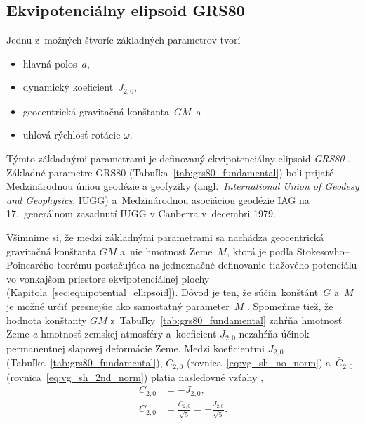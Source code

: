 \documentclass[a4paper,12pt]{book}
\begin{document}
\subsection{Ekvipotenciálny elipsoid GRS80}
\label{sec:grs80}

Jednu z~možných štvoríc základných parametrov tvorí
%
\begin{itemize}
\item hlavná polos~$a$,
%
\item dynamický koeficient~$J_{2,0}$,
%
\item geocentrická gravitačná konštanta~$GM$~a
%
\item uhlová rýchlosť rotácie $\omega$.
\end{itemize}
%
Týmto základnými parametrami je definovaný ekvipotenciálny elipsoid 
\emph{GRS80} \parencite[angl. \textit{Geodetic Reference 
System~1980};][]{GRS80}.  Základné parametre GRS80 
(Tabuľka~\ref{tab:grs80_fundamental}) boli prijaté Medzinárodnou úniou geodézie 
a geofyziky (angl.~\textit{International Union of Geodesy and Geophysics}, 
IUGG) a~Medzinárodnou asociáciou geodézie IAG na 17.~generálnom zasadnutí IUGG 
v Canberra v~decembri 1979.

Všimnime si, že medzi základnými parametrami sa nachádza geocentrická 
gravitačná konštanta $GM$ a~nie hmotnosť Zeme~$M$, ktorá je podľa 
Stokesovho--Poincarého teorému postačujúca na jednoznačné definovanie tiažového 
potenciálu vo vonkajšom priestore ekvipotenciálnej plochy 
(Kapitola~\ref{sec:equipotential_ellipsoid}).  Dôvod je ten, že 
súčin~konštánt~$G$ a~$M$ je možné určiť presnejšie ako samostatný parameter~$M$ 
\parencite[pozri napríklad][]{Pick2000}.  Spomeňme tiež, že hodnota konštanty 
$GM$ z~Tabuľky~\ref{tab:grs80_fundamental} zahŕňa hmotnosť Zeme \emph{a} 
hmotnosť zemskej atmosféry a~koeficient $J_{2,0}$ nezahŕňa účinok permanentnej 
slapovej deformácie Zeme.  Medzi koeficientmi $J_{2,0}$ 
(Tabuľka~\ref{tab:grs80_fundamental}), $C_{2,0}$ 
(rovnica~\ref{eq:vg_sh_no_norm}) a~$\bar{C}_{2,0}$ 
(rovnica~\ref{eq:vg_sh_2nd_norm}) platia nasledovné vzťahy 
\parencite{Moritz1967,MoritzPhysicalGeodesy},
%
\begin{align}
\label{eq:c20_j20}
C_{2,0} &= -J_{2,0}{,}\\
%
\label{eq:c20_j20_2}
\bar{C}_{2,0} &= \frac{C_{2,0}}{\sqrt{5}} = -\frac{J_{2,0}}{\sqrt{5}}{.}
\end{align}
\end{document}
